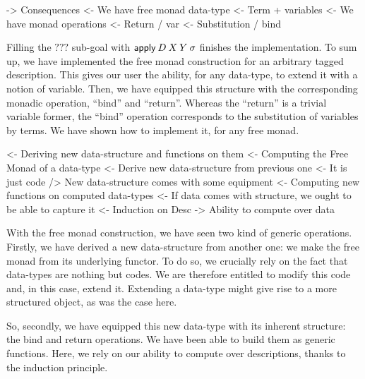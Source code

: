 \begin{wstructure}
    -> Consequences
        <- We have free monad data-type
            <- Term + variables
        <- We have monad operations
            <- Return / var
            <- Substitution / bind
\end{wstructure}

Filling the $???$ sub-goal with $\apply\: D\: X\: Y\: \sigma$ finishes
the implementation. To sum up, we have implemented the free monad
construction for an arbitrary tagged description. This gives our user
the ability, for any data-type, to extend it with a notion of
variable. Then, we have equipped this structure with the
corresponding monadic operation, ``bind'' and ``return''. Whereas the
``return'' is a trivial variable former, the ``bind'' operation
corresponds to the substitution of variables by terms. We have shown
how to implement it, for any free monad.


\begin{wstructure}
<- Deriving new data-structure and functions on them
    <- Computing the Free Monad of a data-type
        <- Derive new data-structure from previous one
            <- It is just code
        /> New data-structure comes with some equipment
    <- Computing new functions on computed data-types
        <- If data comes with structure, we ought to be able to capture it
            <- Induction on Desc
            -> Ability to compute over data
\end{wstructure}

With the free monad construction, we have seen two kind of generic
operations. Firstly, we have derived a new data-structure from another
one: we make the free monad from its underlying functor. To do so, we
crucially rely on the fact that data-types are nothing but codes. We
are therefore entitled to modify this code and, in this case, extend
it. Extending a data-type might give rise to a more structured
object, as was the case here.

So, secondly, we have equipped this new data-type with its inherent
structure: the bind and return operations. We have been able to build
them as generic functions. Here, we rely on our ability to compute
over descriptions, thanks to the induction principle.
